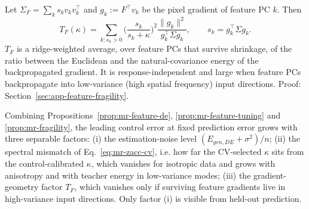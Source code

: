 \begin{prop}
\label{prop:mr-fragility}
Let $\Sigma_F=\sum_ks_kv_kv_k^\top$ and $g_k:=F^\top v_k$ be the pixel gradient of
feature PC $k$.  Then
\begin{equation}
T_F(\kappa)=\sum_{k:s_k>0}\Big(\frac{s_k}{s_k+\kappa}\Big)^2
\frac{\|g_k\|^2}{g_k^\top\Sigma g_k},
\qquad s_k=g_k^\top\Sigma g_k .
\label{eq:mr-fragility}
\end{equation}
$T_F$ is a ridge-weighted average, over feature PCs that survive shrinkage,
of the ratio between the Euclidean and the natural-covariance energy of the
backpropagated gradient.  It is response-independent and large when feature
PCs backpropagate into low-variance (high spatial frequency) input
directions.  Proof: Section~\ref{sec:app-feature-fragility}.
\end{prop}

\begin{remark}
\label{rem:mr-when}
Combining Propositions~\ref{prop:mr-feature-de}, \ref{prop:mr-feature-tuning}
and \ref{prop:mr-fragility}, the leading control error at fixed prediction
error grows with three separable factors:
(i) the estimation-noise level $(E_{gen,DE}+\sigma^2)/n$;
(ii) the spectral mismatch of Eq.~\ref{eq:mr-zacc-cv}, i.e. how far the
CV-selected $\kappa$ sits from the control-calibrated $\kappa$, which
vanishes for isotropic data and grows with anisotropy and with teacher
energy in low-variance modes;
(iii) the gradient-geometry factor $T_F$, which vanishes only if surviving
feature gradients live in high-variance input directions.
Only factor (i) is visible from held-out prediction.
\end{remark}

